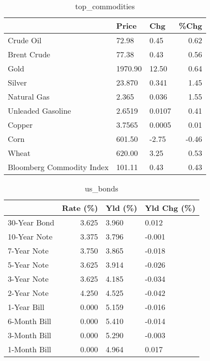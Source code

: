 \documentclass{article}%
\begin{document}
\begin{table}[htbp]%
\caption{top\_commodities}%
\centering%
\begin{adjustbox}{width=1\textwidth}%
\begin{tabular}{lllr}
\toprule
                          &   Price &    Chg &  \%Chg \\
\midrule
               Crude Oil  &   72.98 &   0.45 &  0.62 \\
             Brent Crude  &   77.38 &   0.43 &  0.56 \\
                    Gold  & 1970.90 &  12.50 &  0.64 \\
                  Silver  &  23.870 &  0.341 &  1.45 \\
             Natural Gas  &   2.365 &  0.036 &  1.55 \\
       Unleaded Gasoline  &  2.6519 & 0.0107 &  0.41 \\
                  Copper  &  3.7565 & 0.0005 &  0.01 \\
                    Corn  &  601.50 &  -2.75 & -0.46 \\
                   Wheat  &  620.00 &   3.25 &  0.53 \\
Bloomberg Commodity Index &  101.11 &   0.43 &  0.43 \\
\bottomrule
\end{tabular}
%
\end{adjustbox}%
\end{table}

%


\begin{table}[htbp]%
\caption{us\_bonds}%
\centering%
\begin{adjustbox}{width=1\textwidth}%
\begin{tabular}{lrll}
\toprule
             &  Rate (\%) & Yld (\%) & Yld Chg (\%) \\
\midrule
30-Year Bond &     3.625 &   3.960 &       0.012 \\
10-Year Note &     3.375 &   3.796 &      -0.001 \\
 7-Year Note &     3.750 &   3.865 &      -0.018 \\
 5-Year Note &     3.625 &   3.914 &      -0.026 \\
 3-Year Note &     3.625 &   4.185 &      -0.034 \\
 2-Year Note &     4.250 &   4.525 &      -0.042 \\
 1-Year Bill &     0.000 &   5.159 &      -0.016 \\
6-Month Bill &     0.000 &   5.410 &      -0.014 \\
3-Month Bill &     0.000 &   5.290 &      -0.003 \\
1-Month Bill &     0.000 &   4.964 &       0.017 \\
\bottomrule
\end{tabular}
%
\end{adjustbox}%
\end{table}
\end{document}
